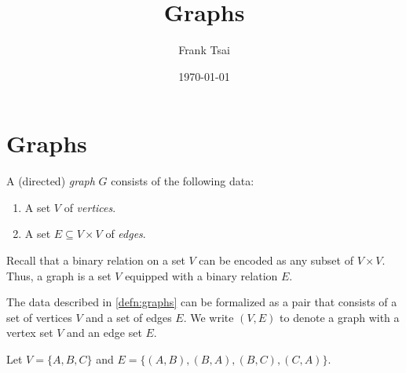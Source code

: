\documentclass{amsart}
\title{Graphs}
\author{Frank Tsai}
\date{\today}
\begin{document}
\maketitle
\tableofcontents

\section{Graphs}
\label{sec:graphs}

\begin{defn}
  \label{defn:graphs}
  A (directed) \emph{graph} $G$ consists of the following data:
  \begin{enumerate}
  \item A set $V$ of \emph{vertices}.
  \item A set $E \subseteq V \times V$ of \emph{edges}.
  \end{enumerate}
\end{defn}

\para
\label{para:edges-are-binary-relations}
Recall that a binary relation on a set $V$ can be encoded as any subset of $V \times V$.
Thus, a graph is a set $V$ equipped with a binary relation $E$.

\begin{notn}
  The data described in \cref{defn:graphs} can be formalized as a pair that consists of a set of vertices $V$ and a set of edges $E$.
  We write $(V, E)$ to denote a graph with a vertex set $V$ and an edge set $E$.
\end{notn}

\begin{eg}
  \label{eg:graphs-example1}
  Let $V = \{A, B, C\}$ and $E = \{(A,B),(B,A),(B,C),(C,A)\}$.
  \begin{center}
  \end{center}
\end{eg}
\end{document}
